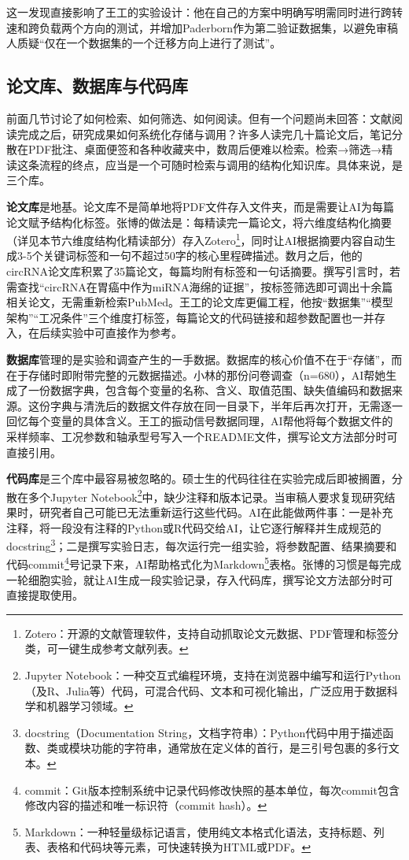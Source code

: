 这一发现直接影响了王工的实验设计：他在自己的方案中明确写明需同时进行跨转速和跨负载两个方向的测试，并增加Paderborn作为第二验证数据集，以避免审稿人质疑``仅在一个数据集的一个迁移方向上进行了测试''。


\subsection{论文库、数据库与代码库}

前面几节讨论了如何检索、如何筛选、如何阅读。但有一个问题尚未回答：文献阅读完成之后，研究成果如何系统化存储与调用？许多人读完几十篇论文后，笔记分散在PDF批注、桌面便签和各种收藏夹中，数周后便难以检索。检索→筛选→精读这条流程的终点，应当是一个可随时检索与调用的结构化知识库。具体来说，是三个库。

\textbf{论文库}是地基。论文库不是简单地将PDF文件存入文件夹，而是需要让AI为每篇论文赋予结构化标签。张博的做法是：每精读完一篇论文，将六维度结构化摘要（详见本节六维度结构化精读部分）存入Zotero\footnote{Zotero：开源的文献管理软件，支持自动抓取论文元数据、PDF管理和标签分类，可一键生成参考文献列表。}，同时让AI根据摘要内容自动生成3-5个关键词标签和一句不超过50字的核心里程碑描述。数月之后，他的circRNA论文库积累了35篇论文，每篇均附有标签和一句话摘要。撰写引言时，若需查找``circRNA在胃癌中作为miRNA海绵的证据''，按标签筛选即可调出十余篇相关论文，无需重新检索PubMed。王工的论文库更偏工程，他按``数据集''``模型架构''``工况条件''三个维度打标签，每篇论文的代码链接和超参数配置也一并存入，在后续实验中可直接作为参考。

\textbf{数据库}管理的是实验和调查产生的一手数据。数据库的核心价值不在于``存储''，而在于存储时即附带完整的元数据描述。小林的那份问卷调查（n=680），AI帮她生成了一份数据字典，包含每个变量的名称、含义、取值范围、缺失值编码和数据来源。这份字典与清洗后的数据文件存放在同一目录下，半年后再次打开，无需逐一回忆每个变量的具体含义。王工的振动信号数据同理，AI帮他将每个数据文件的采样频率、工况参数和轴承型号写入一个README文件，撰写论文方法部分时可直接引用。

\textbf{代码库}是三个库中最容易被忽略的。硕士生的代码往往在实验完成后即被搁置，分散在多个Jupyter Notebook\footnote{Jupyter Notebook：一种交互式编程环境，支持在浏览器中编写和运行Python（及R、Julia等）代码，可混合代码、文本和可视化输出，广泛应用于数据科学和机器学习领域。}中，缺少注释和版本记录。当审稿人要求复现研究结果时，研究者自己可能已无法重新运行这些代码。AI在此能做两件事：一是补充注释，将一段没有注释的Python或R代码交给AI，让它逐行解释并生成规范的docstring\footnote{docstring（Documentation String，文档字符串）：Python代码中用于描述函数、类或模块功能的字符串，通常放在定义体的首行，是三引号包裹的多行文本。}；二是撰写实验日志，每次运行完一组实验，将参数配置、结果摘要和代码commit\footnote{commit：Git版本控制系统中记录代码修改快照的基本单位，每次commit包含修改内容的描述和唯一标识符（commit hash）。}号记录下来，AI帮助格式化为Markdown\footnote{Markdown：一种轻量级标记语言，使用纯文本格式化语法，支持标题、列表、表格和代码块等元素，可快速转换为HTML或PDF。}表格。张博的习惯是每完成一轮细胞实验，就让AI生成一段实验记录，存入代码库，撰写论文方法部分时可直接提取使用。

